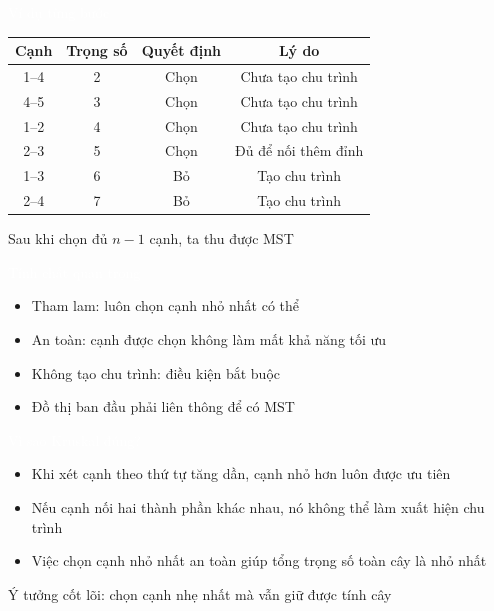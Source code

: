 \documentclass{beamer}
\newcommand{\hlblue}[1]{\textcolor{myblue}{#1}}
\newcommand{\hlgreen}[1]{\textcolor{mygreen}{#1}}
\newcommand{\hlred}[1]{\textcolor{myred}{#1}}
\newcommand{\hlpurple}[1]{\textcolor{mypurple}{#1}}
\newcommand{\hlwhite}[1]{\textcolor{white}{#1}}
\newcommand{\hlorange}[1]{\textcolor{myorange}{#1}}
\begin{document}

\begin{frame}{\hlwhite{Ví dụ từng bước}}
\begin{table}[]
\centering
\begin{tabular}{|c|c|c|c|}
\hline
\rowcolor{blue!10}
\textbf{Cạnh} & \textbf{Trọng số} & \textbf{Quyết định} & \textbf{Lý do} \\
\hline
1--4 & 2 & Chọn & Chưa tạo chu trình \\
\hline
4--5 & 3 & Chọn & Chưa tạo chu trình \\
\hline
1--2 & 4 & Chọn & Chưa tạo chu trình \\
\hline
2--3 & 5 & Chọn & Đủ để nối thêm đỉnh \\
\hline
1--3 & 6 & Bỏ & Tạo chu trình \\
\hline
2--4 & 7 & Bỏ & Tạo chu trình \\
\hline
\end{tabular}
\end{table}

\begin{tcolorbox}
\centering
\hlpurple{Sau khi chọn đủ $n-1$ cạnh, ta thu được MST}
\end{tcolorbox}
\end{frame}


\begin{frame}{\hlwhite{Tính chất quan trọng}}
\begin{itemize}
\item \hlblue{Tham lam}: luôn chọn cạnh nhỏ nhất có thể
\item \hlgreen{An toàn}: cạnh được chọn không làm mất khả năng tối ưu
\item \hlred{Không tạo chu trình}: điều kiện bắt buộc
\item Đồ thị ban đầu phải \hlorange{liên thông} để có MST
\end{itemize}
\end{frame}


\begin{frame}{\hlwhite{Vì sao Kruskal đúng?}}
\begin{itemize}
\item Khi xét cạnh theo thứ tự tăng dần, cạnh nhỏ hơn luôn được ưu tiên
\item Nếu cạnh nối hai thành phần khác nhau, nó không thể làm xuất hiện chu trình
\item Việc chọn cạnh nhỏ nhất an toàn giúp tổng trọng số toàn cây là nhỏ nhất
\end{itemize}

\begin{tcolorbox}
\centering
\hlred{Ý tưởng cốt lõi: chọn cạnh nhẹ nhất mà vẫn giữ được tính cây}
\end{tcolorbox}
\end{frame}
\end{document}
